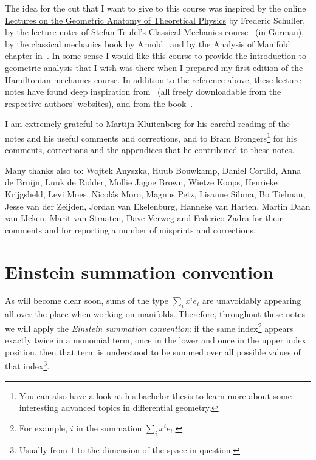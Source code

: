 \documentclass[nobib, a4paper]{tufte-book}
\theoremstyle{plain}
\theoremstyle{definition}
\theoremstyle{remark}
\begin{document}
The idea for the cut that I want to give to this course was inspired by the online \href{https://www.video.uni-erlangen.de/course/id/242}{Lectures on the Geometric Anatomy of Theoretical Physics} by Frederic Schuller, by the lecture notes of Stefan Teufel's Classical Mechanics course~\cite{lectures:teufel} (in German), by the classical mechanics book by Arnold~\cite{book:arnold} and by the Analysis of Manifold chapter in~\cite{book:thirring}.
In some sense I would like this course to provide the introduction to geometric analysis that I wish was there when I prepared my \href{https://www.mseri.me/lecture-notes-hamiltonian-mechanics/}{first edition} of the Hamiltonian mechanics course.
In addition to the reference above, these lecture notes have found deep inspiration from~\cite{lectures:merry,lectures:hitchin} (all freely downloadable from the respective authors' websites), and from the book~\cite{book:abrahammarsdenratiu}.

I am extremely grateful to Martijn Kluitenberg for his careful reading of the notes and his useful comments and corrections, and to Bram Brongers\footnote{You can also have a look at \href{https://fse.studenttheses.ub.rug.nl/25344/}{his bachelor thesis} to learn more about some interesting advanced topics in differential geometry.} for his comments, corrections and the appendices that he contributed to these notes.

Many thanks also to: Wojtek Anyszka, Huub Bouwkamp, Daniel Cortlid, Anna de Bruijn, Luuk de Ridder, Mollie Jagoe Brown, Wietze Koops, Henrieke Krijgsheld, Levi Moes, Nicol\'as Moro, Magnus Petz, Lisanne Sibma, Bo Tielman, Jesse van der Zeijden, Jordan van Ekelenburg, Hanneke van Harten, Martin Daan van IJcken, Marit van Straaten, Dave Verweg and Federico Zadra for their comments and for reporting a number of misprints and corrections.

\mainmatter

\chapter*{Einstein summation convention}

As will become clear soon, sums of the type $\sum_i x^i e_i$ are unavoidably appearing all over the place when working on manifolds.
Therefore, throughout these notes we will apply the \emph{Einstein summation convention}: if the same index\footnote{For example, $i$ in the summation $\sum_i x^i e_i$.} appears exactly twice in a monomial term, once in the lower and once in the upper index position, then that term is understood to be summed over all possible values of that index\footnote{Usually from $1$ to the dimension of the space in question.}.
\end{document}
